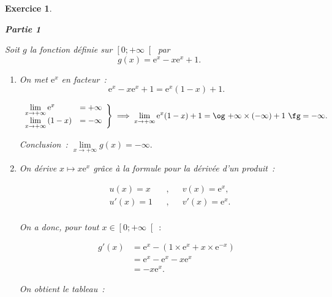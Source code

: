 \documentclass[10pt]{article}
\newtheorem{exo}{Exercice}
\begin{document}
\begin{exo}
~{}

\textbf{Partie 1}

\medskip 
Soit $g$ la fonction définie sur $\left[0;+\infty\right[$ par \[g(x) = \text{e}^x - x\text{e}^x + 1.\]


\begin{enumerate}
\item On met $\text{e}^x$ en facteur~:
\[\text{e}^x - x\text{e}^x + 1=\text{e}^x(1-x) + 1.\]

\[
\left.
    \begin{array}{ll}
        \lim\limits_{x\to +\infty}\text{e}^x&=  +\infty\\
        \lim\limits_{x\to +\infty}\left(1-x\right) &= -\infty
    \end{array}
\right \}\implies \lim\limits_{x\to +\infty}\text{e}^x(1-x) + 1=\text{\og}~{+\infty}\times (-\infty)+1~\text{\fg}=-\infty.
\]

Conclusion~: $\lim\limits_{x\to +\infty}g(x)=-\infty.$

\item 



\setlength{\columnseprule}{1pt}

\begin{multicols}{2}

On dérive $x\mapsto x\text{e}^{x}$ grâce à la formule pour la dérivée d'un produit~:

\begin{align*}
&u(x)=x&&,&& v(x)=\text{e}^{x}, \\
& u'(x)=1&&, &&v'(x)=\text{e}^{x}.\\
\end{align*}

On a donc, pour tout $x\in \left[0;+\infty\right[~:$

\begin{align*}
g'(x)&=\text{e}^{x}-\left(1\times \text{e}^{x}+x\times \text{e}^{-x}\right)
\\&=\text{e}^{x}-\text{e}^{x}-x\text{e}^{x}
\\&=-x\text{e}^{x}.
\end{align*}
\columnbreak

On obtient le tableau~:

\medskip
\begin{center}
\end{center}
\medskip


\end{multicols}
\end{enumerate}
\end{exo}
\end{document}
